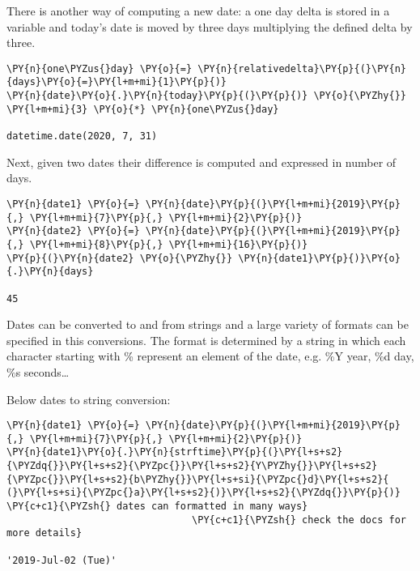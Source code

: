 There is another way of computing a new date: a one day delta is stored in a variable 
and today's date is moved by three days multiplying the defined delta by three.

\begin{tcolorbox}[breakable, size=fbox, boxrule=1pt, pad at break*=1mm,colback=cellbackground, colframe=cellborder]
\begin{Verbatim}[commandchars=\\\{\}]
\PY{n}{one\PYZus{}day} \PY{o}{=} \PY{n}{relativedelta}\PY{p}{(}\PY{n}{days}\PY{o}{=}\PY{l+m+mi}{1}\PY{p}{)}
\PY{n}{date}\PY{o}{.}\PY{n}{today}\PY{p}{(}\PY{p}{)} \PY{o}{\PYZhy{}} \PY{l+m+mi}{3} \PY{o}{*} \PY{n}{one\PYZus{}day}

datetime.date(2020, 7, 31)
\end{Verbatim}
\end{tcolorbox}

Next, given two dates their difference is computed and expressed in number of days.

\begin{tcolorbox}[breakable, size=fbox, boxrule=1pt, pad at break*=1mm,colback=cellbackground, colframe=cellborder]
\begin{Verbatim}[commandchars=\\\{\}]
\PY{n}{date1} \PY{o}{=} \PY{n}{date}\PY{p}{(}\PY{l+m+mi}{2019}\PY{p}{,} \PY{l+m+mi}{7}\PY{p}{,} \PY{l+m+mi}{2}\PY{p}{)}
\PY{n}{date2} \PY{o}{=} \PY{n}{date}\PY{p}{(}\PY{l+m+mi}{2019}\PY{p}{,} \PY{l+m+mi}{8}\PY{p}{,} \PY{l+m+mi}{16}\PY{p}{)}
\PY{p}{(}\PY{n}{date2} \PY{o}{\PYZhy{}} \PY{n}{date1}\PY{p}{)}\PY{o}{.}\PY{n}{days}

45
\end{Verbatim}
\end{tcolorbox}

Dates can be converted to and from strings and a large variety of formats can be specified in this conversions. 
The format is determined by a string in which each character starting with \% represent an element 
of the date, e.g. \%Y year, \%d day, \%s seconds\ldots

Below dates to string conversion:

\begin{tcolorbox}[breakable, size=fbox, boxrule=1pt, pad at break*=1mm,colback=cellbackground, colframe=cellborder]
\begin{Verbatim}[commandchars=\\\{\}]
\PY{n}{date1} \PY{o}{=} \PY{n}{date}\PY{p}{(}\PY{l+m+mi}{2019}\PY{p}{,} \PY{l+m+mi}{7}\PY{p}{,} \PY{l+m+mi}{2}\PY{p}{)}
\PY{n}{date1}\PY{o}{.}\PY{n}{strftime}\PY{p}{(}\PY{l+s+s2}{\PYZdq{}}\PY{l+s+s2}{\PYZpc{}}\PY{l+s+s2}{Y\PYZhy{}}\PY{l+s+s2}{\PYZpc{}}\PY{l+s+s2}{b\PYZhy{}}\PY{l+s+si}{\PYZpc{}d}\PY{l+s+s2}{ (}\PY{l+s+si}{\PYZpc{}a}\PY{l+s+s2}{)}\PY{l+s+s2}{\PYZdq{}}\PY{p}{)} \PY{c+c1}{\PYZsh{} dates can formatted in many ways}
                                \PY{c+c1}{\PYZsh{} check the docs for more details}

'2019-Jul-02 (Tue)'
\end{Verbatim}
\end{tcolorbox}

